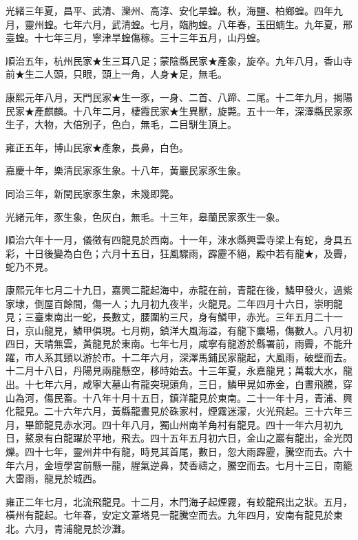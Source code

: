 \begin{pinyinscope}
光緒三年夏，昌平、武清、灤州、高淳、安化旱蝗。秋，海鹽、柏鄉蝗。四年九月，靈州蝗。七年六月，武清蝗。七月，臨朐蝗。八年春，玉田蝻生。九年夏，邢臺蝗。十七年三月，寧津旱蝗傷稼。三十三年五月，山丹蝗。

順治五年，杭州民家★生三耳八足；蒙陰縣民家★產象，旋卒。九年八月，香山寺前★生二人頭，只眼，頭上一角，人身★足，無毛。

康熙元年八月，天門民家★生一豕，一身、二首、八蹄、二尾。十二年九月，揭陽民家★產麒麟。十八年二月，棲霞民家★生異獸，旋斃。五十一年，深澤縣民家豕生子，大物，大倍別子，色白，無毛，二目駢生頂上。

雍正五年，博山民家★產象，長鼻，白色。

嘉慶十年，樂清民家豕生象。十八年，黃巖民家豕生象。

同治三年，新閏民家豕生象，未幾即斃。

光緒元年，豕生象，色灰白，無毛。十三年，皋蘭民家豕生一象。

順治六年十一月，儀徵有四龍見於西南。十一年，淶水縣興雲寺梁上有蛇，身具五彩，十日後變為白色；六月十五日，狂風驟雨，霹靂不絕，殿中若有龍★，及霽，蛇乃不見。

康熙元年七月二十九日，嘉興二龍起海中，赤龍在前，青龍在後，鱗甲發火，過紫家埭，倒屋百餘間，傷一人；九月初九夜半，火龍見。二年四月十六日，崇明龍見；三臺東南出一蛇，長數丈，腰圍約三尺，身有鱗甲，赤光。三年五月二十一日，京山龍見，鱗甲俱現。七月朔，鎮洋大風海溢，有龍下麋場，傷數人。八月初四日，天晴無雲，黃龍見於東南。七年七月，咸寧有龍游於縣署前，雨霽，不能升躍，市人系其頸以游於市。十二年六月，深澤馬鋪民家龍起，大風雨，破壁而去。十二月十八日，丹陽見兩龍懸空，移時始去。十三年夏，永嘉龍見；萬載大水，龍出。十七年六月，咸寧大墓山有龍突現頭角，三日，鱗甲晃如赤金，白晝飛騰，穿山為河，傷民畜。十八年十月十五日，鎮洋龍見於東南。二十一年十月，青浦、興化龍見。二十六年六月，黃縣龍晝見於硃家村，煙霧迷濛，火光飛起。三十六年三月，畢節龍見赤水河。四十年八月，獨山州南羊角村有龍見。四十一年六月初九日，鰲泉有白龍躍於平地，飛去。四十五年五月初六日，金山之巖有龍出，金光閃爍。四十七年，靈州井中有龍，時見其首尾，數日，忽大雨霹靂，騰空而去。六十年六月，金壇學宮前懸一龍，腥氣逆鼻，焚香禱之，騰空而去。七月十三日，南籠大雷雨，龍見於城西。

雍正二年七月，北流飛龍見。十二月，木門海子起煙霧，有蛟龍飛出之狀。五月，橫州有龍起。七年春，安定文葦塔見一龍騰空而去。九年四月，安南有龍見於東北。六月，青浦龍見於沙灘。


\end{pinyinscope}
